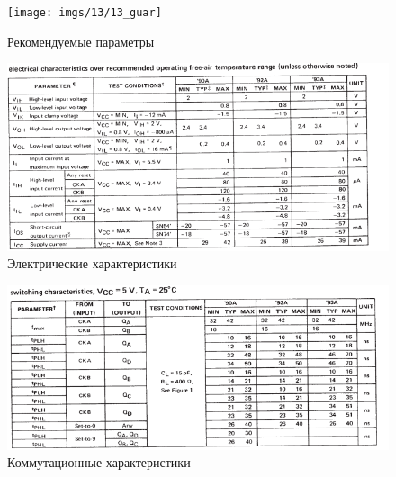 \begin{figure}[H]
	\centering
	\texttt{[image: imgs/13/13\_guar]}
	\caption{Рекомендуемые параметры}
	\label{fig:13_rec}
\end{figure}

\begin{figure}[H]
	\centering
	\includegraphics[width=0.95\linewidth]{imgs/13/13_ch}
	\caption{Электрические характеристики}
	\label{fig:13_ch}
\end{figure}

\begin{figure}[H]
	\centering
	\includegraphics[width=0.95\linewidth]{imgs/13/13_switch}
	\caption{Коммутационные характеристики}
	\label{fig:13_switch}
\end{figure}
